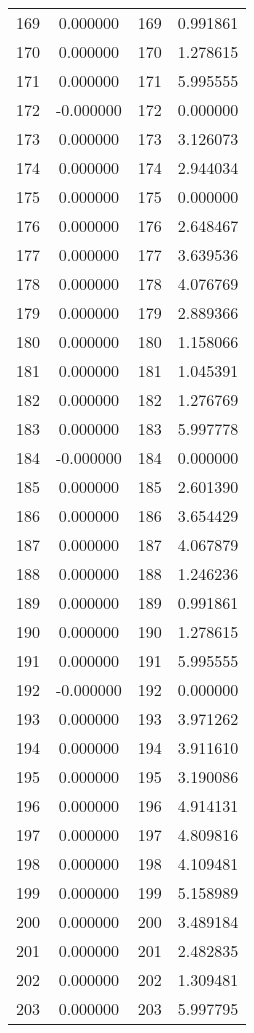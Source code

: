 \documentclass[12pt]{article}
\begin{document}
\begin{longtable}{@{}cccc@{}}
169 & 0.000000 & 169 & 0.991861 \\
170 & 0.000000 & 170 & 1.278615 \\
171 & 0.000000 & 171 & 5.995555 \\
172 & -0.000000 & 172 & 0.000000 \\
173 & 0.000000 & 173 & 3.126073 \\
174 & 0.000000 & 174 & 2.944034 \\
175 & 0.000000 & 175 & 0.000000 \\
176 & 0.000000 & 176 & 2.648467 \\
177 & 0.000000 & 177 & 3.639536 \\
178 & 0.000000 & 178 & 4.076769 \\
179 & 0.000000 & 179 & 2.889366 \\
180 & 0.000000 & 180 & 1.158066 \\
181 & 0.000000 & 181 & 1.045391 \\
182 & 0.000000 & 182 & 1.276769 \\
183 & 0.000000 & 183 & 5.997778 \\
184 & -0.000000 & 184 & 0.000000 \\
185 & 0.000000 & 185 & 2.601390 \\
186 & 0.000000 & 186 & 3.654429 \\
187 & 0.000000 & 187 & 4.067879 \\
188 & 0.000000 & 188 & 1.246236 \\
189 & 0.000000 & 189 & 0.991861 \\
190 & 0.000000 & 190 & 1.278615 \\
191 & 0.000000 & 191 & 5.995555 \\
192 & -0.000000 & 192 & 0.000000 \\
193 & 0.000000 & 193 & 3.971262 \\
194 & 0.000000 & 194 & 3.911610 \\
195 & 0.000000 & 195 & 3.190086 \\
196 & 0.000000 & 196 & 4.914131 \\
197 & 0.000000 & 197 & 4.809816 \\
198 & 0.000000 & 198 & 4.109481 \\
199 & 0.000000 & 199 & 5.158989 \\
200 & 0.000000 & 200 & 3.489184 \\
201 & 0.000000 & 201 & 2.482835 \\
202 & 0.000000 & 202 & 1.309481 \\
203 & 0.000000 & 203 & 5.997795 \\

\end{longtable}
\end{document}
